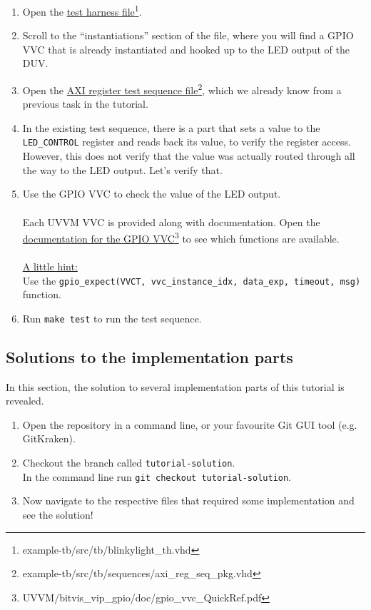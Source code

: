 \begin{enumerate}
      \item Open the \href{../../example-tb/src/tb/blinkylight\_th.vhd} {test harness file}\footnote{example-tb/src/tb/blinkylight\_th.vhd}.
      \item Scroll to the ``instantiations'' section of the file, where you will find a GPIO VVC that is already instantiated and hooked up to the LED output of the DUV.
      \item Open the \href{../../example-tb/src/tb/sequences/axi\_reg\_seq\_pkg.vhd} {AXI register test sequence file}\footnote{example-tb/src/tb/sequences/axi\_reg\_seq\_pkg.vhd}, which we already know from a previous task in the tutorial.
      \item In the existing test sequence, there is a part that sets a value to the \texttt{LED\_CONTROL} register and reads back its value, to verify the register access. However, this does not verify that the value was actually routed through all the way to the LED output. Let's verify that.
      \item Use the GPIO VVC to check the value of the LED output.\\
            \\
            Each UVVM VVC is provided along with documentation. Open the \href{../../UVVM/bitvis\_vip\_gpio/doc/gpio\_vvc\_QuickRef.pdf} {documentation for the GPIO VVC}\footnote{UVVM/bitvis\_vip\_gpio/doc/gpio\_vvc\_QuickRef.pdf} to see which functions are available.\\
            \\
            \underline{A little hint:}\\
            Use the \texttt{gpio\_expect(VVCT, vvc\_instance\_idx, data\_exp, timeout, msg)} function.
      \item Run \texttt{make test} to run the test sequence.

\end{enumerate}

\newpage
\subsection{Solutions to the implementation parts}

In this section, the solution to several implementation parts of this tutorial is revealed.

\begin{enumerate}
      \item Open the repository in a command line, or your favourite Git GUI tool (e.g. GitKraken).
      \item Checkout the branch called \texttt{tutorial-solution}.\\
            In the command line run \texttt{git checkout tutorial-solution}.
      \item Now navigate to the respective files that required some implementation and see the solution!
\end{enumerate}
